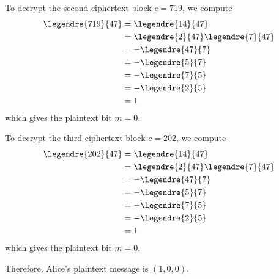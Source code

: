 \documentclass[
  coursecode={MTHE 418},
  assignmentname={Homework \homeworknumber},
  studentnumber=20053722,
  name={Bryan Hoang},
  draft,
]{
  ltxanswer%
}
\begin{document}
\begin{questions}
\begin{parts}
\begin{solution}
        To decrypt the second ciphertext block \(c = 719\), we compute
        \begin{align*}
          \legendre{719}{47} &= \legendre{14}{47}                 \\
                             &= \legendre{2}{47} \legendre{7}{47} \\
                             &= -\legendre{47}{7}                 \\
                             &= -\legendre{5}{7}                  \\
                             &= -\legendre{7}{5}                  \\
                             &= -\legendre{2}{5}                  \\
                             &= 1
        \end{align*}
        which gives the plaintext bit \(m = 0\).

        To decrypt the third ciphertext block \(c = 202\), we compute
        \begin{align*}
          \legendre{202}{47} &= \legendre{14}{47}                 \\
                             &= \legendre{2}{47} \legendre{7}{47} \\
                             &= -\legendre{47}{7}                 \\
                             &= -\legendre{5}{7}                  \\
                             &= -\legendre{7}{5}                  \\
                             &= -\legendre{2}{5}                  \\
                             &= 1
        \end{align*}
        which gives the plaintext bit \(m = 0\).

        Therefore, Alice's plaintext message is \(\boxed{(1, 0, 0)}\).
      \end{solution}


\end{parts}
\end{questions}
\end{document}
